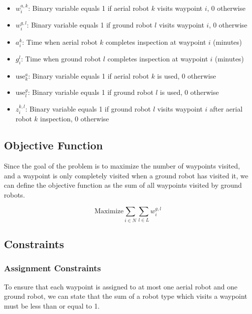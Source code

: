 \documentclass{article}
\begin{document}
				\begin{itemize}
				\item $w_i^{a,k}$: Binary variable equals 1 if aerial robot $k$ visits waypoint $i$, 0 otherwise
				\item $w_i^{g,l}$: Binary variable equals 1 if ground robot $l$ visits waypoint $i$, 0 otherwise
				\item $a_i^k$: Time when aerial robot $k$ completes inspection at waypoint $i$ (minutes)
				\item $g_i^l$: Time when ground robot $l$ completes inspection at waypoint $i$ (minutes)
				\item $\text{use}_k^a$: Binary variable equals 1 if aerial robot $k$ is used, 0 otherwise
				\item $\text{use}_l^g$: Binary variable equals 1 if ground robot $l$ is used, 0 otherwise
				\item $z_i^{k,l}$: Binary variable equals 1 if ground robot $l$ visits waypoint $i$ after aerial robot $k$ inspection, 0 otherwise
				\end{itemize}


		\subsection{Objective Function}

			Since the goal of the problem is to maximize the number of waypoints visited, and a waypoint is only completely visited when a ground robot has visited it, we can define the objective function as the sum of all waypoints visited by ground robots.

			\begin{equation}
			\text{Maximize} \sum_{i \in N}\sum_{l \in L} w_i^{g,l}
			\end{equation}
		

		\subsection{Constraints}

			\subsubsection{Assignment Constraints}
			
				To ensure that each waypoint is assigned to at most one aerial robot and one ground robot, we can state that the sum of a robot type which visits a waypoint must be less than or equal to 1.
\end{document}
